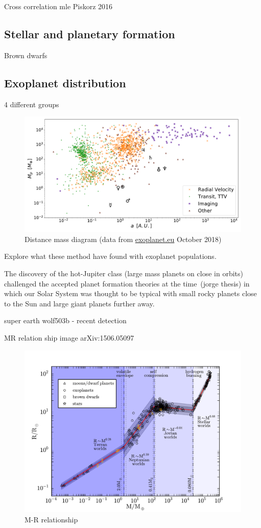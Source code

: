 Cross correlation mle  Piskorz 2016


\subsection{Stellar and planetary formation}

Brown dwarfs

\subsection{Exoplanet distribution} 4 different groups

\fref{}


\begin{figure}
    \centering
    \includegraphics[width=0.7\linewidth]{./figures/introduction/exoplanetEU_a_mass.pdf}
    \caption{Distance mass diagram (data from \href{http://ww.exoplanet.eu}{exoplanet.eu} October 2018)}
    \label{fig:pltoverlayadd}
\end{figure}


Explore what these method have found with exoplanet populations.

The discovery of the hot-Jupiter class (large mass planets on close in orbits) challenged the accepted planet formation theories at the time~\citep[.e.g][]{pollack_formation_1996}(jorge thesis) in which our Solar System was thought to be typical with small rocky planets close to the Sun and large giant planets further away.


super earth wolf503b - recent detection


MR relation ship image arXiv:1506.05097~\citet{chen_probabilistic_2016}

\begin{figure}
    \centering
    \includegraphics[width=0.4\linewidth]{./figures/introduction/mass_radius_relation.pdf}
    \caption{M-R relationship~\citet{chen_probabilistic_2016}}
    \label{fig:mass_radius_relation}
\end{figure}

